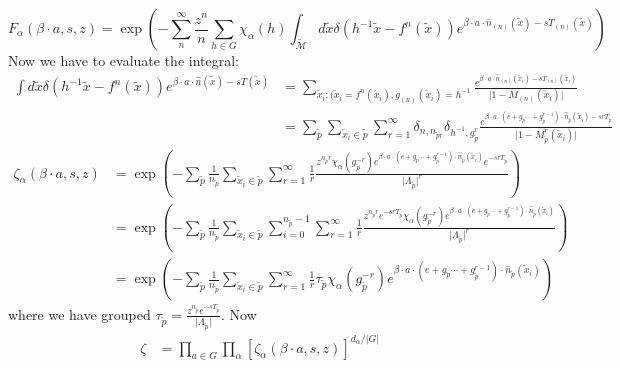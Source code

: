 \begin{description}
\[
F_{\alpha}(\beta\cdot a,s,z)=\exp\left(-\sum_{n}^{\infty}\frac{z^{n}}{n}\sum_{h\in G}\chi_{\alpha}(h)\int_{\mathcal{\tilde{\mathcal{M}}}}d\tilde{x}\delta(h^{-1}\tilde{x}-f^{n}(\tilde{x}))e^{\beta\cdot a\cdot\hat{n}_{(n)}(\tilde{x})-sT_{(n)}(\tilde{x})}\right)
\]
Now we have to evaluate the integral:
\begin{align*}
\int d\tilde{x}\delta(h^{-1}\tilde{x}-f^{n}(\tilde{x}))e^{\beta\cdot a\cdot\hat{n}(\tilde{x})-sT(\tilde{x})} & =\sum_{\tilde{x}_{i}:(\tilde{x}_{i}=f^{n}(\tilde{x}_{i}),g_{(n)}(\tilde{x}_{i})=h^{-1}}\frac{e^{\beta\cdot a\cdot\hat{n}_{(n)}(\tilde{x}_{i})-sT_{(n)}(\tilde{x}_{i})}}{\vert1-M_{(n)}(\tilde{x}_{i})\vert}\\
 & =\sum_{\tilde{p}}\sum_{\tilde{x}_{i}\in\tilde{p}}\sum_{r=1}^{\infty}\delta_{n,n_{\tilde{p}r}}\delta_{h^{-1},g_{\tilde{p}}^{r}}\frac{e^{\beta\cdot a\cdot(e+g_{\tilde{p}}\cdots+g_{\tilde{p}}^{r-1})\cdot\hat{n}_{\tilde{p}}(\tilde{x}_{i})-srT_{\tilde{p}}}}{\vert1-M_{\tilde{p}}^{r}(\tilde{x}_{i})\vert}
\end{align*}
\begin{align*}
\zeta_{\alpha}(\beta\cdot a,s,z) & =\exp\left(-\sum_{\tilde{p}}\frac{1}{n_{\tilde{p}}}\sum_{\tilde{x}_{i}\in\tilde{p}}\sum_{r=1}^{\infty}\frac{1}{r}\frac{z^{n_{\tilde{p}}r}\chi_{\alpha}(g_{\tilde{p}}^{-r})e^{\beta\cdot a\cdot(e+g_{\tilde{p}}\cdots+g_{\tilde{p}}^{r-1})\cdot\hat{n}_{\tilde{p}}(\tilde{x}_{i})}e^{-srT_{\tilde{p}}}}{\vert\Lambda_{\tilde{p}}\vert^{r}}\right)\\
 & =\exp\left(-\sum_{\tilde{p}}\frac{1}{n_{\tilde{p}}}\sum_{\tilde{x}_{i}\in\tilde{p}}\sum_{i=0}^{n_{\tilde{p}}-1}\sum_{r=1}^{\infty}\frac{1}{r}\frac{z^{n_{\tilde{p}}r}e^{-srT_{\tilde{p}}}\chi_{\alpha}(g_{\tilde{p}}^{-r})e^{\beta\cdot a\cdot(e+g_{\tilde{p}}\cdots+g_{\tilde{p}}^{r-1})\cdot\hat{n}_{\tilde{p}}(\tilde{x}_{i})}}{\vert\Lambda_{\tilde{p}}\vert^{r}}\right)\\
 & =\exp\left(-\sum_{\tilde{p}}\frac{1}{n_{\tilde{p}}}\sum_{\tilde{x}_{i}\in\tilde{p}}\sum_{r=1}^{\infty}\frac{1}{r}\tau_{\tilde{p}}\chi_{\alpha}(g_{\tilde{p}}^{-r})e^{\beta\cdot a\cdot(e+g_{\tilde{p}}\cdots+g_{\tilde{p}}^{r-1})\cdot\hat{n}_{\tilde{p}}(\tilde{x}_{i})}\right)
\end{align*}
where we have grouped $\tau_{\tilde{p}}=\frac{z^{n_{\tilde{p}}}e^{-sT_{\tilde{p}}}}{\vert\Lambda_{\tilde{p}}\vert}$.
Now
\begin{align*}
\zeta & =\prod_{a\in G}\prod_{\alpha}\left[\zeta_{\alpha}(\beta\cdot a,s,z)\right]^{d_{\alpha}/\vert G\vert}\\

\end{align*}
\end{description}

